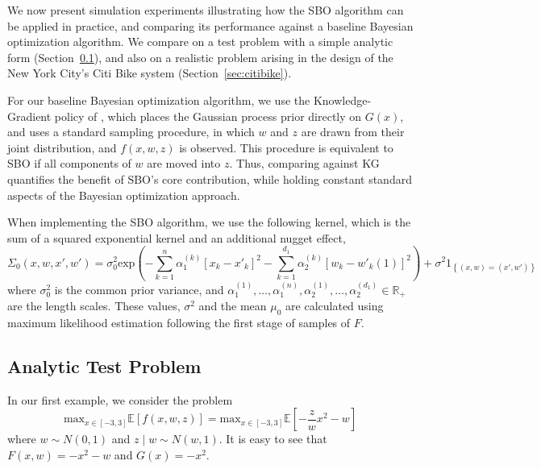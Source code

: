 \documentclass{article} %
\newcommand{\w}{w}
\newcommand{\z}{z}
\begin{document}
We now present simulation experiments illustrating how the SBO algorithm can be applied in practice, and comparing its performance against a baseline Bayesian optimization algorithm.  We compare on a test problem with a simple analytic form (Section~\ref{sec:test}), and also on a realistic problem arising in the design of the New York City's Citi Bike system (Section~\ref{sec:citibike}).

For our baseline Bayesian optimization algorithm, we use the Knowledge-Gradient policy of \cite{frazier2009knowledge}, which places the Gaussian process prior directly on $G(x)$, and uses a standard sampling procedure, in which $\w$ and $\z$ are drawn from their joint distribution, and $f(x,\w,\z)$ is observed.  This procedure is equivalent to SBO if all components of $\w$ are moved into $\z$.  Thus, comparing against KG quantifies the benefit of SBO's core contribution, while holding constant standard aspects of the Bayesian optimization approach.


When implementing the SBO algorithm, we use the following kernel, which is the sum of a squared exponential kernel and an additional nugget effect,
\begin{equation*}
\Sigma_{0}\left(x,\w,x',\w'\right)  =  \sigma_{0}^{2}\mbox{exp}\left(-\sum_{k=1}^{n}\alpha_{1}^{\left(k\right)}\left[x_{k}-x'_{k}\right]^{2}-\sum_{k=1}^{d_{1}}\alpha_{2}^{\left(k\right)}\left[\w_{k}-\w'_{k}\left(1\right)\right]^{2}\right)
  + \sigma^{2}1_{\left\{ \left(x,\w\right)=\left(x',\w'\right)\right\} }
\end{equation*}
where $\sigma_{0}^{2}$ is the common prior variance, and $\alpha_{1}^{\left(1\right)},\ldots,\alpha_{1}^{\left(n\right)},\alpha_{2}^{\left(1\right)},\ldots,\alpha_{2}^{\left(d_{1}\right)}\in\mathbb{R}_{+}$
are the length scales. These values, $\sigma^{2}$ and the mean $\mu_{0}$ are calculated using maximum likelihood estimation following the first stage of samples of $F$.

\subsection{Analytic Test Problem}
\label{sec:test}
In our first example, we consider the problem
\[
\mbox{max}_{x\in\left[-3,3\right]}\mathbb{E}\left[f\left(x,\w,\z\right)\right]=\mbox{max}_{x\in\left[-3,3\right]}\mathbb{E}\left[-\frac{\z}{\w}x^{2}-\w\right]
\]
where $\w\sim N\left(0,1\right)$ and $\z\mid \w\sim N\left(\w,1\right)$. It is easy to see that $F\left(x,\w \right)=-x^{2}-\w$ and $G(x)=-x^{2}$.
\end{document}
